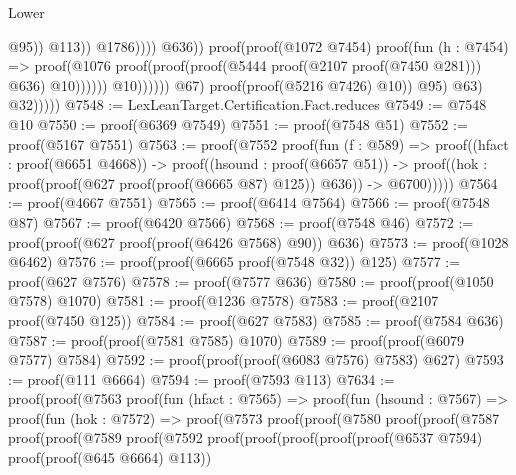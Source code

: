 \begin{lexlean}{Lower}
\begin{coremodule}
                                                                              @95))
                                                                        @113))
                                                                  @1786))))
                                                    @636))
                                              proof(proof(@1072 @7454)
                                                  proof(fun (h : @7454) =>
                                                    proof(@1076
                                                        proof(proof(proof(@5444
                                                                proof(@2107 proof(@7450 @281)))
                                                              @636)
                                                            @10))))))
                                        @10))))))
                        @67)
                      proof(proof(@5216 @7426) @10))
                    @95)
                  @63)
                @32)))))
@7548 := LexLeanTarget.Certification.Fact.reduces
@7549 := @7548 @10
@7550 := proof(@6369 @7549)
@7551 := proof(@7548 @51)
@7552 := proof(@5167 @7551)
@7563 := proof(@7552
      proof(fun (f : @589) =>
        proof((hfact : proof(@6651 @4668)) ->
          proof((hsound : proof(@6657 @51)) ->
            proof((hok : proof(proof(@627 proof(proof(@6665 @87) @125)) @636)) -> @6700)))))
@7564 := proof(@4667 @7551)
@7565 := proof(@6414 @7564)
@7566 := proof(@7548 @87)
@7567 := proof(@6420 @7566)
@7568 := proof(@7548 @46)
@7572 := proof(proof(@627 proof(proof(@6426 @7568) @90)) @636)
@7573 := proof(@1028 @6462)
@7576 := proof(proof(@6665 proof(@7548 @32)) @125)
@7577 := proof(@627 @7576)
@7578 := proof(@7577 @636)
@7580 := proof(proof(@1050 @7578) @1070)
@7581 := proof(@1236 @7578)
@7583 := proof(@2107 proof(@7450 @125))
@7584 := proof(@627 @7583)
@7585 := proof(@7584 @636)
@7587 := proof(proof(@7581 @7585) @1070)
@7589 := proof(proof(@6079 @7577) @7584)
@7592 := proof(proof(proof(@6083 @7576) @7583) @627)
@7593 := proof(@111 @6664)
@7594 := proof(@7593 @113)
@7634 := proof(proof(@7563
        proof(fun (hfact : @7565) =>
          proof(fun (hsound : @7567) =>
            proof(fun (hok : @7572) =>
              proof(@7573
                  proof(proof(@7580
                        proof(proof(@7587
                              proof(proof(@7589
                                    proof(@7592
                                        proof(proof(proof(proof(proof(@6537 @7594)
                                                  proof(proof(@645 @6664) @113))

\end{coremodule}
\end{lexlean}
